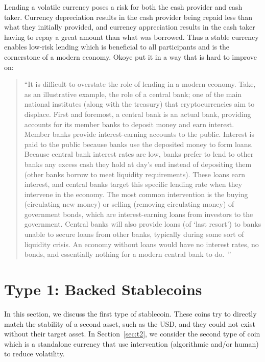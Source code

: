 Lending a volatile currency poses a risk for both the cash provider and cash taker. Currency depreciation results in the cash provider being repaid less than what they initially provided, and currency appreciation results in the cash taker having to repay a great amount than what was borrowed. Thus a stable currency enables low-risk lending which is beneficial to all participants and is the cornerstone of a modern economy. Okoye \etal put it in a way that is hard to improve on:

\begin{quote}

``It is difficult to overstate the role of lending in a modern economy. Take, as an illustrative example, the role of a central bank; one of the main national institutes (along with the treasury) that cryptocurrencies aim to displace. First and foremost, a central bank is an actual bank, providing accounts for its member banks to deposit money and earn interest. Member banks provide interest-earning accounts to the public. Interest is paid to the public because banks use the deposited money to form loans. Because central bank interest rates are low, banks prefer to lend to other banks any excess cash they hold at day's end instead of depositing them (other banks borrow to meet liquidity requirements). These loans earn interest, and central banks target this specific lending rate when they intervene in the economy. The most common intervention is the buying (circulating new money) or selling (removing circulating money) of government bonds, which are interest-earning loans from investors to the government. Central banks will also provide loans (of `last resort') to banks unable to secure loans from other banks, typically during some sort of liquidity crisis. An economy without loans would have no interest rates, no bonds, and essentially nothing for a modern central bank to do.~\cite{okoyetoward}''

\end{quote}







\section{Type 1: Backed Stablecoins}
\label{sec:t1}

In this section, we discuss the first type of stablecoin. These coins try to directly match the stability of a second asset, such as the USD, and they could not exist without their target asset. In Section~\ref{sec:t2}, we consider the second type of coin which is a standalone currency that use intervention (algorithmic and/or human) to reduce volatility.

